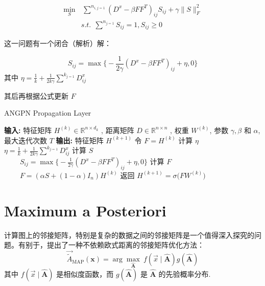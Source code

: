 \documentclass[color=gray,base=hide,cn]{elegantbook}
\begin{document}
\begin{equation}
    \begin{aligned}
        \min_{S} & \, \sum^n\nolimits_{i,j=1}(D^x-\beta FF^T)_{ij}S_{ij}+\gamma \|S\|^2_F
        \\ & s.t. \ \ \sum^n\nolimits_{j=1}S_{ij}=1, S_{ij}\geq 0
    \end{aligned}
\end{equation}

这一问题有一个闭合（解析）解：

\begin{equation}
    S_{ij} = \max\big\{-\frac{1}{2\gamma}(D^x - \beta FF^T)_{ij} + \eta, 0\big\}%
\end{equation}
其中 $\eta = \frac{1}{k} +\frac{1}{2k\gamma}\sum^k\nolimits_{j=1} D^x_{ij}$

其后再根据公式更新 $F$

\begin{algorithm}[h]
    \caption{ANGPN Propagation Layer}
    \begin{algorithmic}[1]
        \STATE \textbf{输入:} 特征矩阵 ${H}^{(k)}\in \mathbb{R}^{n\times d_k}$ , 距离矩阵 $D\in \mathbb{R}^{n\times n}$ , 权重 $W^{(k)}$, 参数 $\gamma, \beta$ 和 $\alpha$,  最大迭代次数 $T$
        \STATE \textbf{输出:} 特征矩阵 $H^{(k+1)}$
        \STATE 令 $F = H^{(k)}$
        \STATE 计算 $\eta$ %
        $
            \textstyle \eta = \frac{1}{k} +\frac{1}{2k\gamma}\sum^k\nolimits_{j=1} D^x_{ij}
        $
        \STATE 计算 $S$\\
        $
            \ \ \ \ \ \ \ \ \ \ S_{ij} = \max\big\{-\frac{1}{2\gamma}(D^x - \beta FF^T)_{ij} + \eta, 0\big\}
        $
        \STATE 计算 $F$\\
        $
            \ \ \ \ \ \ \ \ \ \ F = (\alpha S + (1-\alpha) I_n)H^{(k)}%
        $
        \ENDFOR \label{code:recentEnd}
        \STATE 返回
        $
            H^{(k+1)} =\sigma\big( {F}  {W}^{(k)}\big)
        $
        \emph{}
    \end{algorithmic}
\end{algorithm}

\section{Maximum a Posteriori}
计算图上的邻接矩阵，特别是复杂的数据之间的邻接矩阵是一个值得深入探究的问题。有别于\cite{Jiang2019SemisupervisedLW}，\cite{gao2019exploring}提出了一种不依赖欧式距离的邻接矩阵优化方法：
\begin{equation}
    \vec{\tilde{A}}_\text{MAP}(\mathbf{x}) = \arg \max_{\mathbf{\hat{A}}} \ f(\vec{x} \mid \mathbf{\hat{A}})g(\mathbf{\hat{A}})
\end{equation}
其中 $ f(\vec{x} \mid \mathbf{\hat{A}})$ 是相似度函数，而 $g(\mathbf{\hat{A}})$ 是 $\mathbf{\hat{A}}$ 的先验概率分布.
\end{document}

